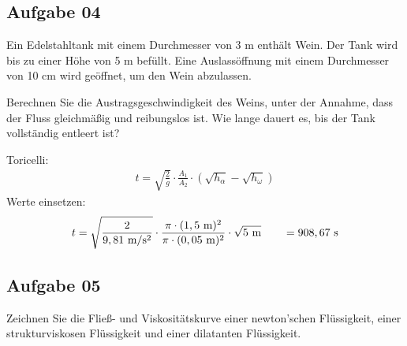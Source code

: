 \documentclass[a4paper,10pt]{article}
\begin{document}
\subsection*{Aufgabe 04}
Ein Edelstahltank mit einem Durchmesser von 3 m enthält Wein. Der Tank wird bis zu
einer Höhe von 5 m befüllt. Eine Auslassöffnung mit einem Durchmesser von 10 cm wird
geöffnet, um den Wein abzulassen. \par Berechnen Sie die Austragsgeschwindigkeit des
Weins, unter der Annahme, dass der Fluss gleichmäßig und reibungslos ist. Wie lange
dauert es, bis der Tank vollständig entleert ist?


Toricelli:
\begin{align*}
t = \sqrt{\frac{2}{g}} \cdot \frac{A_1}{A_2} \cdot (\sqrt{h_{\alpha}}-\sqrt{h_{\omega}})
\end{align*}
Werte einsetzen:
\begin{align*}
t = \sqrt{\frac{2}{9,81~\text{m}/\text{s}^2}} \cdot \frac{\pi \cdot (1,5~\text{m})^2}{\pi \cdot (0,05~\text{m})^2} \cdot \sqrt{5~\text{m}} \qquad = 908,67~\text{s}
\end{align*}



\pagebreak
\subsection*{Aufgabe 05}
Zeichnen Sie die Fließ- und Viskositätskurve einer newton'schen Flüssigkeit, einer
strukturviskosen Flüssigkeit und einer dilatanten Flüssigkeit.
\ppbig
\end{document}
